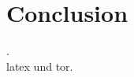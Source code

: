 
\section{Conclusion}

\lipsum[1] \cite{nguyen_machine_2018}.  \\

\lipsum[1] \gls{latex} und \acrshort{tor}. \\